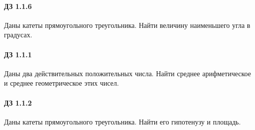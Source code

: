 \documentclass[12pt,a4paper]{report}
\begin{document}
\paragraph*{ДЗ 1.1.6}
Даны катеты прямоугольного треугольника. Найти величину наименьшего угла в градусах.






\paragraph*{ДЗ 1.1.1}
Даны два действительных положительных числа. Найти среднее арифметическое и среднее геометрическое этих чисел.

\paragraph*{ДЗ 1.1.2}
Даны катеты прямоугольного треугольника. Найти его гипотенузу и площадь.
\end{document}
